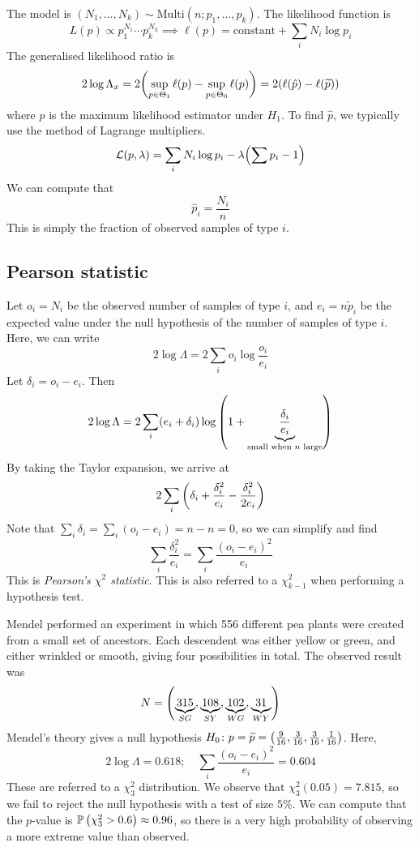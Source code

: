 The model is \( (N_1, \dots, N_k) \sim \mathrm{Multi}(n; p_1, \dots, p_k) \).
The likelihood function is
\[
	L(p) \propto p_1^{N_1} \cdots p_k^{N_k} \implies \ell(p) = \text{constant} + \sum_i N_i \log p_i
\]
The generalised likelihood ratio is
\[
	2 \log \Lambda_x = 2\qty(\sup_{p \in \Theta_1} \ell(p) - \sup_{p \in \Theta_0} \ell(p)) = 2\qty(\ell(\hat p) - \ell(\widetilde p))
\]
where \( \hat p \) is the maximum likelihood estimator under \( H_1 \).
To find \( \hat p \), we typically use the method of Lagrange multipliers.
\[
	\mathcal L(p, \lambda) = \sum_i N_i \log p_i - \lambda \qty(\sum p_i - 1)
\]
We can compute that
\[
	\hat p_i = \frac{N_i}{n}
\]
This is simply the fraction of observed samples of type \( i \).

\subsection{Pearson statistic}
Let \( o_i = N_i \) be the observed number of samples of type \( i \), and \( e_i = n \widetilde p_i \) be the expected value under the null hypothesis of the number of samples of type \( i \).
Here, we can write
\[
	2 \log \Lambda = 2 \sum_i o_i \log \frac{o_i}{e_i}
\]
Let \( \delta_i = o_i - e_i \).
Then
\[
	2 \log \Lambda = 2 \sum_i (e_i + \delta_i) \log\qty(1 + \underbrace{\frac{\delta_i}{e_i}}_{\text{small when } n \text{ large}})
\]
By taking the Taylor expansion, we arrive at
\[
	2 \sum_i \qty(\delta_i + \frac{\delta_i^2}{e_i} - \frac{\delta_i^2}{2e_i})
\]
Note that \( \sum_i \delta_i = \sum_i (o_i - e_i) = n - n = 0 \), so we can simplify and find
\[
	\sum_i \frac{\delta_i^2}{e_i} = \sum_i \frac{(o_i - e_i)^2}{e_i}
\]
This is \textit{Pearson's \( \chi^2 \) statistic}.
This is also referred to a \( \chi^2_{k-1} \) when performing a hypothesis test.
\begin{example}
	Mendel performed an experiment in which 556 different pea plants were created from a small set of ancestors.
	Each descendent was either yellow or green, and either wrinkled or smooth, giving four possibilities in total.
	The observed result was
	\[
		N = \qty(\underbrace{315}_{SG}, \underbrace{108}_{SY}, \underbrace{102}_{WG}, \underbrace{31}_{WY})
	\]
	Mendel's theory gives a null hypothesis \( H_0 \colon p = \widetilde p = \qty(\frac{9}{16}, \frac{3}{16}, \frac{3}{16}, \frac{1}{16}) \).
	Here,
	\[
		2 \log \Lambda = 0.618;\quad \sum_i \frac{(o_i - e_i)^2}{e_i} = 0.604
	\]
	These are referred to a \( \chi^2_3 \) distribution.
	We observe that \( \chi^2_3(0.05) = 7.815 \), so we fail to reject the null hypothesis with a test of size \( 5\% \).
	We can compute that the \( p \)-value is \( \mathbb{P}\left({\chi^2_3 > 0.6}\right) \approx 0.96 \), so there is a very high probability of observing a more extreme value than observed.
\end{example}

